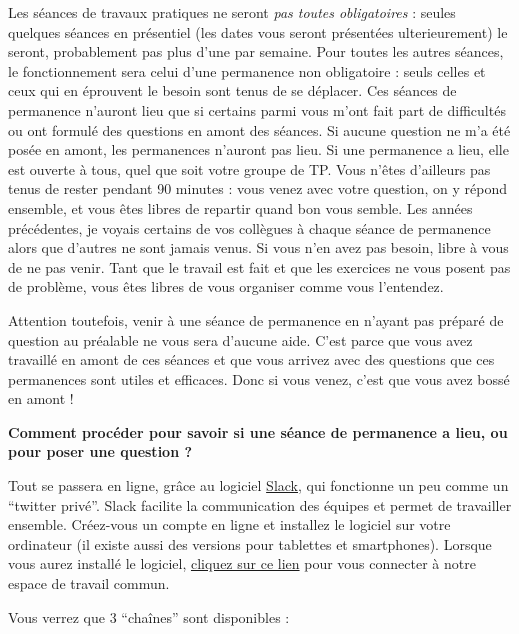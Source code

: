 \documentclass[
  a4paper,
]{article}
\begin{document}
Les séances de travaux pratiques ne seront \emph{pas toutes obligatoires} : seules quelques séances en présentiel (les dates vous seront présentées ulterieurement) le seront, probablement pas plus d'une par semaine. Pour toutes les autres séances, le fonctionnement sera celui d'une permanence non obligatoire : seuls celles et ceux qui en éprouvent le besoin sont tenus de se déplacer. Ces séances de permanence n'auront lieu que si certains parmi vous m'ont fait part de difficultés ou ont formulé des questions en amont des séances. Si aucune question ne m'a été posée en amont, les permanences n'auront pas lieu. Si une permanence a lieu, elle est ouverte à tous, quel que soit votre groupe de TP. Vous n'êtes d'ailleurs pas tenus de rester pendant 90 minutes : vous venez avec votre question, on y répond ensemble, et vous êtes libres de repartir quand bon vous semble. Les années précédentes, je voyais certains de vos collègues à chaque séance de permanence alors que d'autres ne sont jamais venus. Si vous n'en avez pas besoin, libre à vous de ne pas venir. Tant que le travail est fait et que les exercices ne vous posent pas de problème, vous êtes libres de vous organiser comme vous l'entendez.

Attention toutefois, venir à une séance de permanence en n'ayant pas préparé de question au préalable ne vous sera d'aucune aide. C'est parce que vous avez travaillé en amont de ces séances et que vous arrivez avec des questions que ces permanences sont utiles et efficaces. Donc si vous venez, c'est que vous avez bossé en amont !

\textbf{Comment procéder pour savoir si une séance de permanence a lieu, ou pour poser une question ?}

Tout se passera en ligne, grâce au logiciel \href{https://slack.com/intl/fr-fr/}{Slack}, qui fonctionne un peu comme un ``twitter privé''. Slack facilite la communication des équipes et permet de travailler ensemble. Créez-vous un compte en ligne et installez le logiciel sur votre ordinateur (il existe aussi des versions pour tablettes et smartphones). Lorsque vous aurez installé le logiciel, \href{https://join.slack.com/t/geel2020/shared_invite/zt-grop8wl2-xxV0PNg8DFpVUYmmdk0WAA}{cliquez sur ce lien} pour vous connecter à notre espace de travail commun.

Vous verrez que 3 ``chaînes'' sont disponibles :
\end{document}
